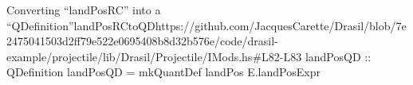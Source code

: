 \begin{haskell}{Converting ``landPosRC'' into a ``QDefinition''}{landPosRCtoQD}{https://github.com/JacquesCarette/Drasil/blob/7e2475041503d2ff79e522e0695408b8d32b576e/code/drasil-example/projectile/lib/Drasil/Projectile/IMods.hs\#L82-L83}
landPosQD :: QDefinition
landPosQD = mkQuantDef landPos E.landPosExpr
\end{haskell}
